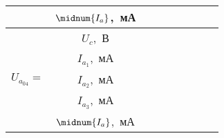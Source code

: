 \documentclass[10pt,pscyr,nonums]{hedlabwork}
\begin{document}
\begin{table}[h!]
\begin{tabular}{|m{}|*{8}{C{.07}|}}
        & \( \midnum{I_a} \),~мА &
            &&&&&& \\ \hline
         & \( U_c \),~В &
            &&&&&& \\ 
        & \( I_{a_1} \),~мА &
            &&&&&& \\ 
        & \( I_{a_2} \),~мА &
            &&&&&& \\ 
        & \( I_{a_3} \),~мА &
            &&&&&& \\ 
        & \( \midnum{I_a} \),~мА &
            &&&&&& \\ \hline
        \end{tabular}
    \end{table}
    
    \pagebreak
    
\end{document}
